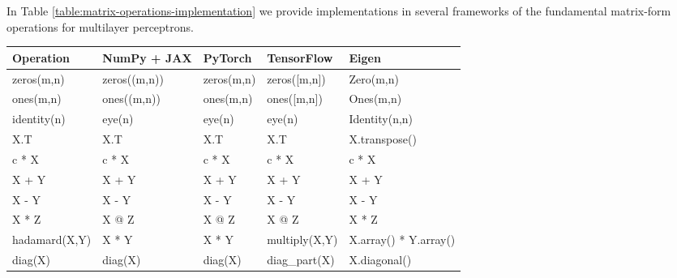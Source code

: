 \documentclass{article}
\begin{document}
\clearpage
In Table \ref{table:matrix-operations-implementation} we provide implementations in several frameworks of the fundamental matrix-form operations for multilayer perceptrons.
\begin{table*}[htb]
\scriptsize
\centering
\begin{tabular}{ p{2.2cm}|p{2.6cm}p{2.6cm}p{2.6cm}p{3.6cm} }
 \toprule
 Operation & NumPy + JAX & PyTorch & TensorFlow & Eigen\\
 \midrule
\textsf{zeros(m,n)}            & \textsf{zeros((m,n))}           & \textsf{zeros(m,n)}              & \textsf{zeros([m,n])}                & \textsf{Zero(m,n)}                      \\
\textsf{ones(m,n)}             & \textsf{ones((m,n))}            & \textsf{ones(m,n)}               & \textsf{ones([m,n])}                 & \textsf{Ones(m,n)}                      \\
\textsf{identity(n)}           & \textsf{eye(n)}                 & \textsf{eye(n)}                  & \textsf{eye(n)}                      & \textsf{Identity(n,n)}                  \\
\textsf{X.T}                   & \textsf{X.T}                    & \textsf{X.T}                     & \textsf{X.T}                         & \textsf{X.transpose()}                   \\
\textsf{c * X}                 & \textsf{c * X}                  & \textsf{c * X}                   & \textsf{c * X}                       & \textsf{c * X}                           \\
\textsf{X + Y}                 & \textsf{X + Y}                  & \textsf{X + Y}                   & \textsf{X + Y}                       & \textsf{X + Y}                           \\
\textsf{X - Y}                 & \textsf{X - Y}                  & \textsf{X - Y}                   & \textsf{X - Y}                       & \textsf{X - Y}                           \\
\textsf{X * Z}                 & \textsf{X @ Z}                  & \textsf{X @ Z}                   & \textsf{X @ Z}                       & \textsf{X * Z}                           \\
\textsf{hadamard(X,Y)}         & \textsf{X * Y}                  & \textsf{X * Y}                   & \textsf{multiply(X,Y)}               & \textsf{X.array() * Y.array()}           \\
\textsf{diag(X)}               & \textsf{diag(X)}                & \textsf{diag(X)}                 & \textsf{diag\_part(X)}               & \textsf{X.diagonal()}                    \\

\end{tabular}
\end{table*}
\end{document}
